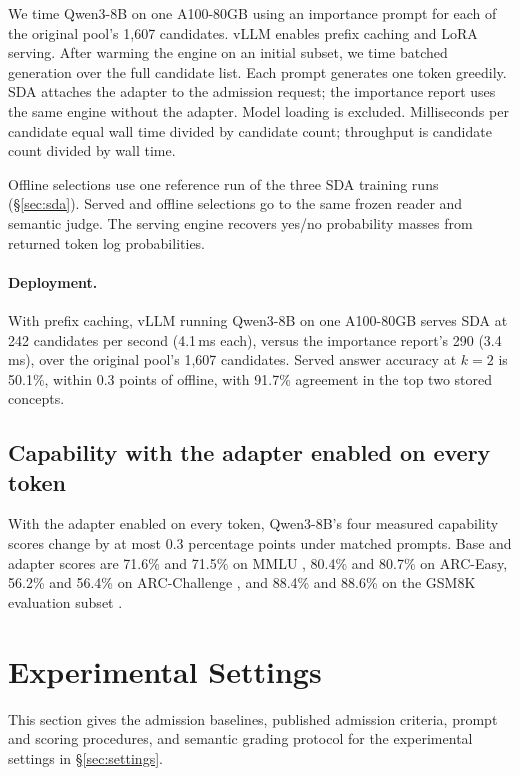 We time Qwen3-8B on one A100-80GB using an importance prompt for each of the original pool's 1,607 candidates. vLLM enables prefix caching and LoRA serving. After warming the engine on an initial subset, we time batched generation over the full candidate list. Each prompt generates one token greedily. SDA attaches the adapter to the admission request; the importance report uses the same engine without the adapter. Model loading is excluded. Milliseconds per candidate equal wall time divided by candidate count; throughput is candidate count divided by wall time.

Offline selections use one reference run of the three SDA training runs (\S\ref{sec:sda}). Served and offline selections go to the same frozen reader and semantic judge. The serving engine recovers yes/no probability masses from returned token log probabilities.

\paragraph{Deployment.}\label{sec:deployment}
With prefix caching, vLLM running Qwen3-8B on one A100-80GB serves SDA at 242 candidates per second (4.1\,ms each), versus the importance report's 290 (3.4\,ms), over the original pool's 1,607 candidates. Served answer accuracy at $k=2$ is 50.1\%, within 0.3 points of offline, with 91.7\% agreement in the top two stored concepts.



\subsection{Capability with the adapter enabled on every token}
\label{app:capability}

With the adapter enabled on every token, Qwen3-8B's four measured capability scores change by at most 0.3 percentage points under matched prompts. Base and adapter scores are 71.6\% and 71.5\% on MMLU \citep{hendrycks2021mmlu}, 80.4\% and 80.7\% on ARC-Easy, 56.2\% and 56.4\% on ARC-Challenge \citep{clark2018arc}, and 88.4\% and 88.6\% on the GSM8K evaluation subset \citep{cobbe2021gsm8k}.


\section{Experimental Settings}
\label{app:repro}

This section gives the admission baselines, published admission criteria, prompt and scoring procedures, and semantic grading protocol for the experimental settings in \S\ref{sec:settings}.


